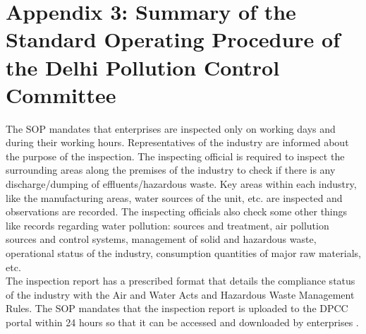 \documentclass[a4paper, 12pt, twoside]{article}
\begin{document}
		\newpage
		\section*{Appendix 3: Summary of the Standard Operating Procedure of the Delhi Pollution Control Committee}
		\singlespacing
				
		The SOP mandates that enterprises are inspected only on working days and during their working hours. Representatives of the industry are informed about the purpose of the inspection. The inspecting official is required to inspect the surrounding areas along the premises of the industry to check if there is any discharge/dumping of effluents/hazardous waste. Key areas within each industry, like the manufacturing areas, water sources of the unit, etc. are inspected and observations are recorded. The inspecting officials also check some other things like records regarding water pollution: sources and treatment, air pollution sources and control systems, management of solid and hazardous waste, operational status of the industry, consumption quantities of major raw materials, etc. \\
		
		The inspection report has a prescribed format that details the compliance status of the industry with the Air and Water Acts and Hazardous Waste Management Rules. The SOP mandates that the inspection report is uploaded to the DPCC portal within 24 hours so that it can be accessed and downloaded by enterprises \parencite{DPCCb}.


		
		
		
		
		

						
				
		
		
		

		
				


		
		
\end{document}
